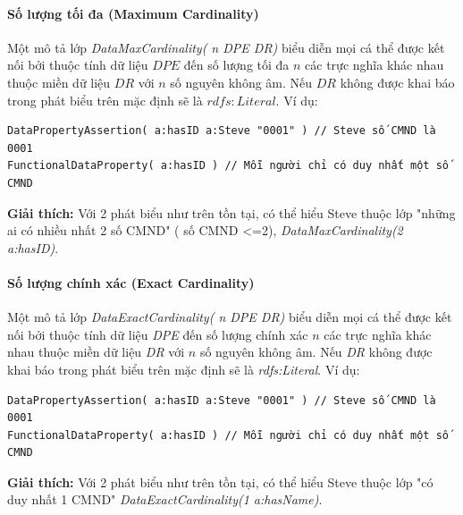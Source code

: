 \paragraph{Số lượng tối đa (Maximum Cardinality)} Một mô tả lớp \textit{DataMaxCardinality( n DPE DR)} biểu diễn mọi cá thể được kết nối bởi thuộc tính dữ liệu $DPE$ đến số lượng tối đa $n$ các trực nghĩa khác nhau thuộc miền dữ liệu  $DR$ với $n$ số nguyên không âm. Nếu $DR$ không được khai báo trong phát biểu trên mặc định sẽ là $rdfs:Literal$. Ví dụ:
\begin{verbatim}
DataPropertyAssertion( a:hasID a:Steve "0001" ) // Steve số CMND là 0001
FunctionalDataProperty( a:hasID ) // Mỗi người chỉ có duy nhất một số CMND
\end{verbatim}
\textbf{Giải thích:} Với 2 phát biểu như trên tồn tại, có thể hiểu Steve thuộc lớp "những ai có nhiều nhất 2 số CMND" ( số CMND <=2), \textit{DataMaxCardinality(2 a:hasID)}.

\paragraph{Số lượng chính xác (Exact Cardinality)} Một mô tả lớp \textit{DataExactCardinality( n DPE DR)}  biểu diễn mọi cá thể được kết nối bởi thuộc tính dữ liệu \textit{DPE} đến số lượng chính xác $n$ các trực nghĩa khác nhau thuộc miền dữ liệu  \textit{DR} với $n$ số nguyên không âm. Nếu \textit{DR} không được khai báo trong phát biểu trên mặc định sẽ là \textit{rdfs:Literal}. Ví dụ:
\begin{verbatim}
DataPropertyAssertion( a:hasID a:Steve "0001" ) // Steve số CMND là 0001
FunctionalDataProperty( a:hasID ) // Mỗi người chỉ có duy nhất một số CMND
\end{verbatim}
\textbf{Giải thích:} Với 2 phát biểu như trên tồn tại, có thể hiểu Steve thuộc lớp "có duy nhất 1 CMND" \textit{DataExactCardinality(1 a:hasName)}.

